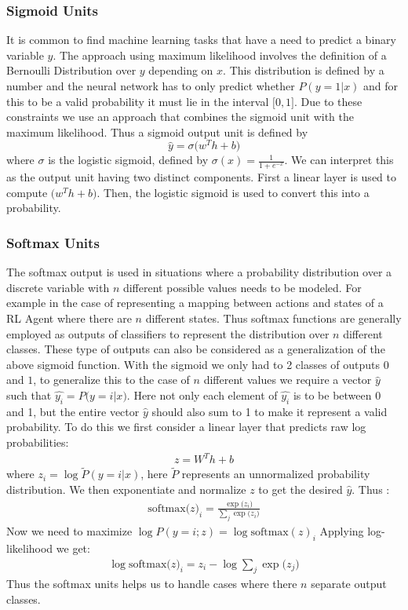 \documentclass[14pt]{extarticle}
\numberwithin{equation}{section}
\begin{document}
		\subsubsection{Sigmoid Units}		
		It is common to find machine learning tasks that have a need to predict a binary variable $y$. The approach using maximum likelihood involves the definition of a Bernoulli Distribution over $y$ depending on $x$. This distribution is defined by a number and the neural network has to only predict whether $P(y=1 | x)$ and for this to be a valid probability it must lie in the interval $\big[0,1\big]$. Due to these constraints we use an approach that combines the sigmoid unit with the maximum likelihood. Thus a sigmoid output unit is defined by 
		\begin{equation}
		\hat{y} = \sigma\big(w^T h + b\big)
		\end{equation}
		where $\sigma$ is the logistic sigmoid, defined by $\sigma(x) = \frac{1}{1 + e^{-x} }$. We can interpret this as the output unit having two distinct components. First a linear layer is used to compute $\big(w^T h + b\big)$. Then, the logistic sigmoid is used to convert this into a probability.
		\subsubsection{Softmax Units}		\label{softmax}
		The softmax output is used in situations where a probability distribution over a discrete variable with $n$ different possible values needs to be modeled. For example in the case of representing a mapping between actions and states of a RL Agent where there are $n$ different states. Thus softmax functions are generally employed as outputs of classifiers to represent the distribution over $n$ different classes. These type of outputs can also be considered as a generalization of the above sigmoid function. With the sigmoid we only had to 2 classes of outputs $0$ and $1$, to generalize this to the case of $n$ different values we require a vector $\hat{y}$ such that $\hat{y_i} = P\big(y=i | x\big)$. Here not only each element of $\hat{y_i}$ is to be between 0 and 1, but the entire vector $\hat{y}$ should also sum to 1 to make it represent a valid probability. To do this we first consider a linear layer that predicts raw log probabilities:
		\begin{align}
		z = W^T h + b 
		\end{align} 
		where $z_i =\log \tilde{P}(y = i | x)$, here $\tilde{P}$ represents an unnormalized probability distribution. We then exponentiate and normalize $z$ to get the desired $\hat{y}$. Thus :
		\begin{align}
		\text{softmax}\big(z\big)_i = \frac{\exp\big(z_i\big)}{\sum_{j}\exp\big(z_i\big)}
		\end{align}
		Now we need to maximize $\log P(y=i;z) = \log \text{softmax}(z)_i $ Applying log-likelihood we get:
		\begin{align}
		\log \text{softmax}\big(z\big)_i = z_i - \log \sum_{j}\exp\big(z_j\big)
		\end{align}
		Thus the softmax units helps us to handle cases where there $n$ separate output classes.
\end{document}
